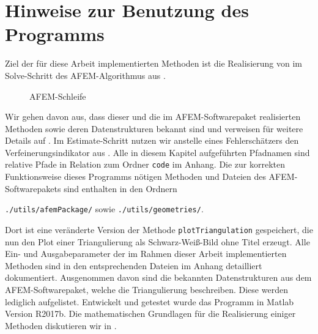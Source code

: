 \section{Hinweise zur Benutzung des Programms}
Ziel der für diese Arbeit implementierten Methoden ist die Realisierung von
 im Solve-Schritt des AFEM-Algorithmus aus
. 
\begin{figure}
  \centering
  
  \caption{AFEM-Schleife}
  \label{fig:afemLoop}
\end{figure}
Wir gehen davon aus, dass dieser und die im AFEM-Softwarepaket \cite{Car09}
realisierten Methoden sowie deren Datenstrukturen bekannt sind und verweisen
für weitere Details auf \cite{CGKNRR10}. 
Im Estimate-Schritt nutzen wir anstelle eines Fehlerschätzers den
Verfeinerungsindikator aus .
Alle in diesem Kapitel aufgeführten Pfadnamen sind relative Pfade in Relation
zum Ordner \texttt{code} im Anhang.
Die zur korrekten Funktionsweise dieses Programms nötigen Methoden und
Dateien des AFEM-Softwarepakets sind enthalten in den Ordnern
\begin{center}
    \texttt{./utils/afemPackage/} sowie \texttt{./utils/geometries/}.
\end{center}
Dort ist eine veränderte Version der Methode \texttt{plotTriangulation}
gespeichert, die nun den Plot einer Triangulierung als Schwarz-Weiß-Bild ohne
Titel erzeugt.
Alle Ein- und Ausgabeparameter der im Rahmen dieser Arbeit implementierten
Methoden sind in den entsprechenden Dateien im Anhang detailliert dokumentiert. 
Ausgenommen davon sind die bekannten Datenstrukturen aus dem
AFEM-Softwarepaket, welche die Triangulierung beschreiben. 
Diese werden lediglich aufgelistet.
Entwickelt und getestet wurde das Programm in Matlab Version R2017b.
Die mathematischen Grundlagen für die Realisierung einiger Methoden diskutieren
wir in .

